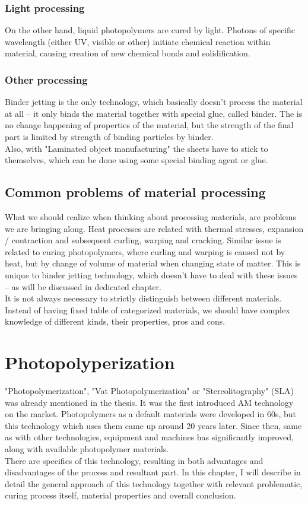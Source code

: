 \documentclass[a4paper, twoside, 11pt]{report}
\begin{document}
\subsection{Light processing}
On the other hand, liquid photopolymers are cured by light. Photons of specific wavelength (either UV, visible or other) initiate chemical reaction within material, causing creation of new chemical bonds and solidification.
\subsection{Other processing}
Binder jetting is the only technology, which basically doesn't process the material at all – it only binds the material together with special glue, called binder. The is no change happening of properties of the material, but the strength of the final part is limited by strength of binding particles by binder.\\
Also, with "Laminated object manufacturing" the sheets have to stick to themselves, which can be done using some special binding agent or glue.

\section{Common problems of material processing}
What we should realize when thinking about processing materials, are problems we are bringing along. Heat processes are related with thermal stresses, expansion / contraction and subsequent curling, warping and cracking. Similar issue is related to curing photopolymers, where curling and warping is caused not by heat, but by change of volume of material when changing state of matter. This is unique to binder jetting technology, which doesn't have to deal with these issues – as will be discussed in dedicated chapter.\\
It is not always necessary to strictly distinguish between different materials. Instead of having fixed table of categorized materials, we should have complex knowledge of different kinds, their properties, pros and cons. 

\chapter{Photopolyperization}
"Photopolymerization", "Vat Photopolymerization" or "Stereolitography" (SLA) was already mentioned in the thesis. It was the first introduced AM technology on the market. Photopolymers as a default materials were developed in 60s, but this technology which uses them came up around 20 years later. Since then, same as with other technologies, equipment and machines has significantly improved, along with available photopolymer materials.\\
There are specifics of this technology, resulting in both advantages and disadvantages of the process and resultant part. In this chapter, I will describe in detail the general approach of this technology together with relevant problematic, curing process itself, material properties and overall conclusion.
\end{document}
